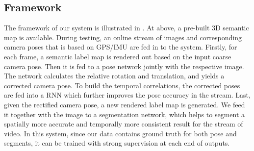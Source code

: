 \vspace{-1.0\baselineskip}
\subsection{Framework}
\vspace{-0.6\baselineskip}
\label{sub:framework}
The framework of our system is illustrated in . At above, a pre-built 3D semantic map is available. During testing, an online stream of images and corresponding camera poses that is based on GPS/IMU are fed in to the system. Firstly, for each frame, a semantic label map is rendered out based on the input coarse camera pose. Then it is fed to a pose network jointly with the respective image.  The network calculates the relative rotation and translation, and yields a corrected camera pose. To build the temporal correlations, the corrected poses are fed into a RNN which further improves the pose accuracy in the stream.
Last, given the rectified camera pose, a new rendered label map is generated. We feed it together with the image to a segmentation network, which helps to segment a spatially more accurate and temporally more consistent result for the stream of video.
In this system, since our data contains ground truth for both pose and segments, it can be trained with strong supervision at each end of outputs.
